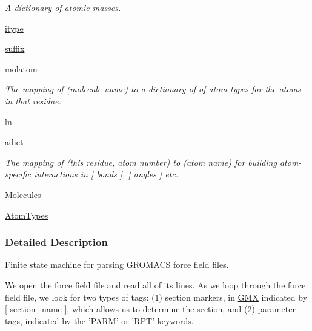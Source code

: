 \begin{DoxyCompactItemize}
\begin{DoxyCompactList}\small\item\em \-A dictionary of atomic masses. \end{DoxyCompactList}\item 
\hyperlink{classforcebalance_1_1gmxio_1_1ITP__Reader_a4b9a75f9c96a86fc99969ae97ae08dc2}{itype}
\item 
\hyperlink{classforcebalance_1_1gmxio_1_1ITP__Reader_ab35c32e7ecf74028641613f90906bd37}{suffix}
\item 
\hyperlink{classforcebalance_1_1gmxio_1_1ITP__Reader_a5ed800499e9442adaea0cee243960f94}{molatom}
\begin{DoxyCompactList}\small\item\em \-The mapping of (molecule name) to a dictionary of of atom types for the atoms in that residue. \end{DoxyCompactList}\item 
\hyperlink{classforcebalance_1_1BaseReader_a80c8e3bea212600742968aa8669e557b}{ln}
\item 
\hyperlink{classforcebalance_1_1BaseReader_a2c46ad6b66cf09a30e917ce4a1997e2a}{adict}
\begin{DoxyCompactList}\small\item\em \-The mapping of (this residue, atom number) to (atom name) for building atom-\/specific interactions in \mbox{[} bonds \mbox{]}, \mbox{[} angles \mbox{]} etc. \end{DoxyCompactList}\item 
\hyperlink{classforcebalance_1_1BaseReader_a4369b5fb663a83b11602daa71db6862e}{\-Molecules}
\item 
\hyperlink{classforcebalance_1_1BaseReader_a69ca7d949a4a3df4d9f61e617fe0e270}{\-Atom\-Types}
\end{DoxyCompactItemize}


\subsubsection{\-Detailed \-Description}
\-Finite state machine for parsing \-G\-R\-O\-M\-A\-C\-S force field files. 

\-We open the force field file and read all of its lines. \-As we loop through the force field file, we look for two types of tags\-: (1) section markers, in \hyperlink{classforcebalance_1_1gmxio_1_1GMX}{\-G\-M\-X} indicated by \mbox{[} section\-\_\-name \mbox{]}, which allows us to determine the section, and (2) parameter tags, indicated by the '\-P\-A\-R\-M' or '\-R\-P\-T' keywords.

